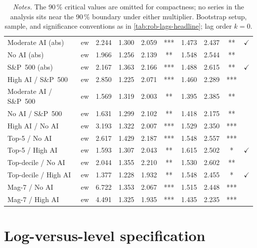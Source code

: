 \begin{table}[!htbp]
\begin{tabular}{l c S[table-format=1.3] S[table-format=1.3] S[table-format=1.3] c S[table-format=1.3] S[table-format=1.3] c c}
Moderate AI (abs)          & ew & 2.244 & 1.300 & 2.059 & *** & 1.473 & 2.437 & **  & $\checkmark$ \\
No AI (abs)                & ew & 1.966 & 1.256 & 2.139 & **  & 1.548 & 2.544 & **  & \\
S\&P~500 (abs)             & ew & 2.167 & 1.363 & 2.166 & *** & 1.488 & 2.615 & **  & $\checkmark$ \\
High AI / S\&P~500         & ew & 2.850 & 1.225 & 2.071 & *** & 1.460 & 2.289 & *** & \\
Moderate AI / S\&P~500     & ew & 1.569 & 1.319 & 2.003 & **  & 1.395 & 2.385 & **  & \\
No AI / S\&P~500           & ew & 1.631 & 1.299 & 2.102 & **  & 1.418 & 2.175 & **  & \\
High AI / No AI            & ew & 3.193 & 1.322 & 2.007 & *** & 1.529 & 2.350 & *** & \\
Top-5 / No AI              & ew & 2.617 & 1.429 & 2.187 & *** & 1.548 & 2.557 & *** & \\
Top-5 / High AI            & ew & 1.593 & 1.307 & 2.043 & **  & 1.615 & 2.502 & *   & $\checkmark$ \\
Top-decile / No AI         & ew & 2.044 & 1.355 & 2.210 & **  & 1.530 & 2.602 & **  & \\
Top-decile / High AI       & ew & 1.377 & 1.228 & 1.932 & **  & 1.548 & 2.455 & *   & $\checkmark$ \\
Mag-7 / No AI              & ew & 6.722 & 1.353 & 2.067 & *** & 1.515 & 2.448 & *** & \\
Mag-7 / High AI            & ew & 4.491 & 1.325 & 1.935 & *** & 1.435 & 2.235 & *** & \\
\bottomrule
\end{tabular}
\caption*{\footnotesize \textit{Notes.} The 90\,\% critical values are omitted for compactness; no series in the analysis sits near the 90\,\% boundary under either multiplier. Bootstrap setup, sample, and significance conventions as in \cref{tab:rob-lags-headline}; lag order $k=0$.}
\end{table}
 
 
\section{Log-versus-level specification}
\label{app:rob-loglevel}
 

